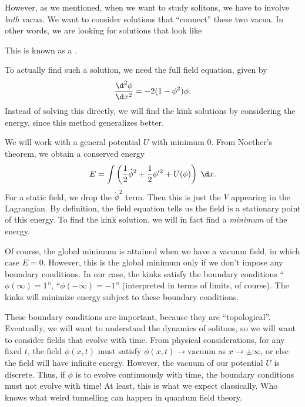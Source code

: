 \documentclass[a4paper]{article}
\begin{document}
However, as we mentioned, when we want to study solitons, we have to involve \emph{both} vacua. We want to consider solutions that ``connect'' these two vacua. In other words, we are looking for solutions that look like
\begin{center}
\end{center}
This is known as a .

To actually find such a solution, we need the full field equation, given by
\[
  \frac{\d^2 \phi}{\d x^2} = -2 (1 - \phi^2) \phi.
\]
Instead of solving this directly, we will find the kink solutions by considering the energy, since this method generalizes better.

We will work with a general potential $U$ with minimum $0$. From Noether's theorem, we obtain a conserved energy
\[
  E = \int \left(\frac{1}{2} \dot{\phi}^2 + \frac{1}{2} \phi'^2 + U(\phi)\right)\;\d x.
\]
For a static field, we drop the $\dot{\phi}^2$ term. Then this is just the $V$ appearing in the Lagrangian. By definition, the field equation tells us the field is a stationary point of this energy. To find the kink solution, we will in fact find a \emph{minimum} of the energy.

Of course, the global minimum is attained when we have a vacuum field, in which case $E = 0$. However, this is the global minimum only if we don't impose any boundary conditions. In our case, the kinks satisfy the boundary conditions ``$\phi(\infty) = 1$'', ``$\phi(-\infty) = -1$'' (interpreted in terms of limits, of course). The kinks will minimize energy subject to these boundary conditions.

These boundary conditions are important, because they are ``topological''. Eventually, we will want to understand the dynamics of solitons, so we will want to consider fields that evolve with time. From physical considerations, for any fixed $t$, the field $\phi(x, t)$ must satisfy $\phi(x, t) \to \text{vacuum}$ as $x \to \pm \infty$, or else the field will have infinite energy. However, the vacuum of our potential $U$ is discrete. Thus, if $\phi$ is to evolve continuously with time, the boundary conditions must not evolve with time! At least, this is what we expect classically. Who knows what weird tunnelling can happen in quantum field theory.
\end{document}
